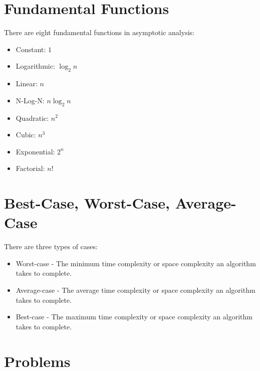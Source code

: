 \documentclass{book}
\begin{document}
\section{Fundamental Functions}
There are eight fundamental functions in asymptotic analysis:

\begin{itemize}
  \item Constant: $1$
  \item Logarithmic: $\log_{2}{n}$
  \item Linear: $n$
  \item N-Log-N: $n\log_{2}{n}$
  \item Quadratic: $n^2$
  \item Cubic: $n^3$
  \item Exponential: $2^n$
  \item Factorial: $n!$
\end{itemize}

\section{Best-Case, Worst-Case, Average-Case}

There are three types of cases:

\begin{itemize}
  \item Worst-case - The minimum time complexity or space complexity an algorithm takes to complete.
  \item Average-case - The average time complexity or space complexity an algorithm takes to complete.
  \item Best-case - The maximum time complexity or space complexity an algorithm takes to complete.
\end{itemize}

\newpage

\section{Problems}
\end{document}

